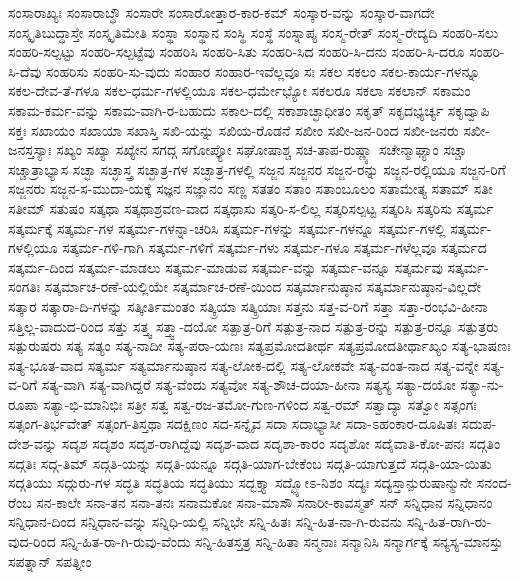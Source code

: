 {ಸಂಸಾರಾಖ್ಯಃ
ಸಂಸಾರಾಬ್ಧೌ
ಸಂಸಾರೇ
ಸಂಸಾರೋತ್ತಾರ-ಕಾರ-ಕಮ್
ಸಂಸ್ಕಾರ-ವನ್ನು
ಸಂಸ್ಕಾರ-ವಾಗದೇ
ಸಂಸ್ಕೃತಿಬುದ್ಧಾಸ್ತೇ
ಸಂಸ್ಕೃತಿಮೇತಿ
ಸಂಸ್ಥಾ
ಸಂಸ್ಥಾನ
ಸಂಸ್ಥಿ
ಸಂಸ್ಥೆ
ಸಂಸ್ನಾಪ್ಯ
ಸಂಸ್ಮ-ರೇತ್
ಸಂಸ್ಮ-ರೇದ್ಯದಿ
ಸಂಹರಿ-ಸಲು
ಸಂಹರಿ-ಸಲ್ಪಟ್ಟು
ಸಂಹರಿ-ಸಲ್ಪಟ್ಟೆವು
ಸಂಹರಿಸಿ
ಸಂಹರಿ-ಸಿತು
ಸಂಹರಿ-ಸಿದ
ಸಂಹರಿ-ಸಿ-ದನು
ಸಂಹರಿ-ಸಿ-ದರೂ
ಸಂಹರಿ-ಸಿ-ದೆವು
ಸಂಹರಿಸು
ಸಂಹರಿ-ಸು-ವುದು
ಸಂಹಾರ
ಸಂಹಾರ-ಇವೆಲ್ಲವೂ
ಸಃ
ಸಕಲ
ಸಕಲಂ
ಸಕಲ-ಕಾರ್ಯ-ಗಳನ್ನೂ
ಸಕಲ-ದೇವ-ತೆ-ಗಳೂ
ಸಕಲ-ಧರ್ಮ-ಗಳಲ್ಲಿಯೂ
ಸಕಲ-ಧರ್ಮೇಭ್ಯೋ
ಸಕಲರೂ
ಸಕಲಾ
ಸಕಲಾನ್
ಸಕಾಮಂ
ಸಕಾಮ-ಕರ್ಮ-ವನ್ನು
ಸಕಾಮ-ವಾಗಿ-ರ-ಬಹುದು
ಸಕಾಲ-ದಲ್ಲಿ
ಸಕಾಶಾಚ್ಛಾಧೀತಂ
ಸಕೃತ್
ಸಕೃದಭ್ಯರ್ಚ್ಯ
ಸಕೃದ್ವಾಪಿ
ಸಕ್ತಃ
ಸಖಾಯಂ
ಸಖಾಯಾ
ಸಖಾಸ್ತಿ
ಸಖಿ-ಯನ್ನು
ಸಖಿಯ-ರೊಡನೆ
ಸಖೀಂ
ಸಖೀ-ಜನ-ರಿಂದ
ಸಖೀ-ಜನರು
ಸಖೀ-ಜನಸ್ತಸ್ಯಾಃ
ಸಖ್ಯಂ
ಸಖ್ಯಾ
ಸಖ್ಯೇನ
ಸಗದ್ಗ
ಸಗೋಪ್ಯೋ
ಸಘೋಷಾಶ್ಚ
ಸಚ-ತಾಪ-ರುಷ್ಣ್ಯಾ
ಸಚೇನ್ಮಾಘ್ಯಾಂ
ಸಚ್ಚಾ
ಸಚ್ಚಾತ್ರಾಭ್ಯಾಸ
ಸಚ್ಛಾ
ಸಚ್ಛಾಸ್ತ್ರ
ಸಚ್ಛಾತ್ರ-ಗಳ
ಸಚ್ಛಾತ್ರ-ಗಳಲ್ಲಿ
ಸಜ್ಜನ
ಸಜ್ಜನರ
ಸಜ್ಜನ-ರನ್ನು
ಸಜ್ಜನ-ರಲ್ಲಿಯೂ
ಸಜ್ಜನ-ರಿಗೆ
ಸಜ್ಜನರು
ಸಜ್ಜನ-ಸ-ಮುದಾ-ಯಕ್ಕೆ
ಸಜ್ಞನ
ಸಜ್ಞಾನಂ
ಸಣ್ಣ
ಸತತಂ
ಸತಾಂ
ಸತಾಂಬೂಲಂ
ಸತಾಮೇತ್ಯ
ಸತಾಮ್
ಸತೀ
ಸತೀಮ್
ಸತುಷಂ
ಸತ್ಕಥಾ
ಸತ್ಕಥಾಶ್ರವಣ-ವಾದ
ಸತ್ಕಥಾಸು
ಸತ್ಕರಿ-ಸ-ಲಿಲ್ಲ
ಸತ್ಕರಿಸಲ್ಪಟ್ಟ
ಸತ್ಕರಿಸಿ
ಸತ್ಕರಿಸು
ಸತ್ಕರ್ಮ
ಸತ್ಕರ್ಮಕ್ಕೆ
ಸತ್ಕರ್ಮ-ಗಳ
ಸತ್ಕರ್ಮ-ಗಳನ್ನಾ-ಚರಿಸಿ
ಸತ್ಕರ್ಮ-ಗಳನ್ನು
ಸತ್ಕರ್ಮ-ಗಳನ್ನೂ
ಸತ್ಕರ್ಮ-ಗಳಲ್ಲಿ
ಸತ್ಕರ್ಮ-ಗಳಲ್ಲಿಯೂ
ಸತ್ಕರ್ಮ-ಗಳಿ-ಗಾಗಿ
ಸತ್ಕರ್ಮ-ಗಳಿಗೆ
ಸತ್ಕರ್ಮ-ಗಳು
ಸತ್ಕರ್ಮ-ಗಳೂ
ಸತ್ಕರ್ಮ-ಗಳೆಲ್ಲವೂ
ಸತ್ಕರ್ಮದ
ಸತ್ಕರ್ಮ-ದಿಂದ
ಸತ್ಕರ್ಮ-ಮಾಡಲು
ಸತ್ಕರ್ಮ-ಮಾಡುವ
ಸತ್ಕರ್ಮ-ವನ್ನು
ಸತ್ಕರ್ಮ-ವನ್ನೂ
ಸತ್ಕರ್ಮವು
ಸತ್ಕರ್ಮ-ಸಂಗತಿಃ
ಸತ್ಕರ್ಮಾಚ-ರಣೆ-ಯಲ್ಲಿಯೇ
ಸತ್ಕರ್ಮಾಚ-ರಣೆ-ಯಿಂದ
ಸತ್ಕರ್ಮಾನುಷ್ಠಾನ
ಸತ್ಕರ್ಮಾನುಷ್ಠಾನ-ವಿಲ್ಲದೇ
ಸತ್ಕಾರ
ಸತ್ಕಾರಾ-ದಿ-ಗಳನ್ನು
ಸತ್ಕೀರ್ತಿಮಂತಂ
ಸತ್ಕ್ರಿಯಾ
ಸತ್ಕ್ರಿಯಾಃ
ಸತ್ತನು
ಸತ್ತ-ವ-ರಿಗೆ
ಸತ್ತಾ
ಸತ್ತಾ-ರಂಭವಿ-ಹೀನಾ
ಸತ್ತಿಲ್ಲ-ವಾದುದ-ರಿಂದ
ಸತ್ತು
ಸತ್ತ್ವ
ಸತ್ತ್ವಾ-ದಯೋ
ಸತ್ಪಾತ್ರ-ರಿಗೆ
ಸತ್ಪುತ್ರ-ನಾದ
ಸತ್ಪುತ್ರ-ರನ್ನು
ಸತ್ಪುತ್ರ-ರನ್ನೂ
ಸತ್ಪುತ್ರರು
ಸತ್ಪುರುಷರು
ಸತ್ಯ
ಸತ್ಯಂ
ಸತ್ಯ-ನಾದೀ
ಸತ್ಯ-ಪರಾ-ಯಣಃ
ಸತ್ಯಪ್ರಮೋದತೀರ್ಥ
ಸತ್ಯಪ್ರಮೋದತೀರ್ಥಾಖ್ಯಂ
ಸತ್ಯ-ಭಾಷಣಃ
ಸತ್ಯ-ಭೂತ-ವಾದ
ಸತ್ಯರ್ಮ
ಸತ್ಯರ್ಮಾನುಷ್ಠಾನ
ಸತ್ಯ-ಲೋಕ-ದಲ್ಲಿ
ಸತ್ಯ-ಲೋಕವೇ
ಸತ್ಯ-ವಂತ-ನಾದ
ಸತ್ಯ-ವನ್ನೇ
ಸತ್ಯ-ವ-ರಿಗೆ
ಸತ್ಯ-ವಾಗಿ
ಸತ್ಯ-ವಾಗಿದ್ದರೆ
ಸತ್ಯ-ವೆಂದು
ಸತ್ಯವೋ
ಸತ್ಯ-ಶೌಚ-ದಯಾ-ಹೀನಾ
ಸತ್ಯಸ್ಯ
ಸತ್ಯಾ-ದಯೋ
ಸತ್ಯಾ-ನು-ರೂಪಾ
ಸತ್ಯಾ-ಭಿ-ಮಾನಿಭಿಃ
ಸತ್ರೀ
ಸತ್ವ
ಸತ್ವ-ರಜ-ತಮೋ-ಗುಣ-ಗಳಿಂದ
ಸತ್ವ-ರಮ್
ಸತ್ವಾದ್ಯಾ
ಸತ್ವೋ
ಸತ್ಸಂಗಃ
ಸತ್ಸಂಗ-ತಿರ್ಭವೇತ್
ಸತ್ಸಂಗ-ತಿಸ್ತಥಾ
ಸದಕ್ಷಿಣಂ
ಸದ-ಸನ್ನೈವ
ಸದಾ
ಸದಾಭ್ಯಾಸೀ
ಸದಾ-ಽಹಂಕಾರ-ದೂಷಿತಃ
ಸದುಪ-ದೇಶ-ವನ್ನು
ಸದೃಶ
ಸದೃಶಂ
ಸದೃಶ-ರಾಗಿದ್ದೆವು
ಸದೃಶ-ವಾದ
ಸದೃಶಾ-ಕಾರಂ
ಸದೃಶೋ
ಸದೈವಾತಿ-ಕೋ-ಪನಃ
ಸದ್ಗತಿಂ
ಸದ್ಗತಿಃ
ಸದ್ಗ-ತಿಮ್
ಸದ್ಗತಿ-ಯನ್ನು
ಸದ್ಗತಿ-ಯನ್ನೂ
ಸದ್ಗತಿ-ಯಾಗ-ಬೇಕೆಂಬ
ಸದ್ಗತಿ-ಯಾಗುತ್ತದೆ
ಸದ್ಗತಿ-ಯಾ-ಯಿತು
ಸದ್ಗತಿಯು
ಸದ್ಗುರು-ಗಳ
ಸದ್ಧತಿ
ಸದ್ಧತಿಯ
ಸದ್ಧತಿಯು
ಸದ್ಭಕ್ತ್ಯಾ
ಸದ್ಭ್ಯೋಽ-ನಿಶಂ
ಸದ್ಯಃ
ಸದ್ಯಸ್ತಾನ್ಪುರುಷಾನ್ಮುನೇ
ಸನಂದ-ರೆಂಬ
ಸನ-ಕಾಲೇ
ಸನಾ-ತನ
ಸನಾ-ತನಃ
ಸನಾಮಕೋ
ಸನಾ-ಮಾಸೌ
ಸನಾರೀ-ಕಾವಸ್ಮತ್
ಸನ್
ಸನ್ನಿಧಾನ
ಸನ್ನಿಧಾನಂ
ಸನ್ನಿಧಾನ-ದಿಂದ
ಸನ್ನಿಧಾನ-ವನ್ನು
ಸನ್ನಿಧಿ-ಯಲ್ಲಿ
ಸನ್ನಿಭೇ
ಸನ್ನಿ-ಹಿತಃ
ಸನ್ನಿ-ಹಿತ-ನಾ-ಗಿ-ರುವನು
ಸನ್ನಿ-ಹಿತ-ರಾಗಿ-ರು-ವುದ-ರಿಂದ
ಸನ್ನಿ-ಹಿತ-ರಾ-ಗಿ-ರುವು-ವೆಂದು
ಸನ್ನಿ-ಹಿತಸ್ತತ್ರ
ಸನ್ನಿ-ಹಿತಾ
ಸನ್ಮನಾಃ
ಸನ್ಮಾನಿಸಿ
ಸನ್ಮಾರ್ಗಕ್ಕೆ
ಸನ್ಯಸ್ಯ-ಮಾನಸ್ತು
ಸಪತ್ನಾನ್
ಸಪತ್ನೀಂ
}
